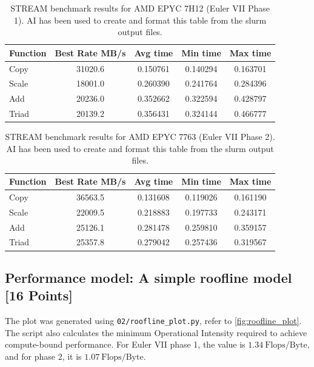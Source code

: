 \documentclass[unicode,10pt,a4paper,oneside,numbers=endperiod,openany]{scrartcl}
\begin{document}
\begin{table}[hbt]
   \centering
   \begin{tabular}{| l | c | c | c | c |}
     \hline
     Function & Best Rate MB/s & Avg time & Min time & Max time \\
     \hline
     Copy & 31020.6 & 0.150761 & 0.140294 & 0.163701 \\
     \hline
     Scale & 18001.0 & 0.260390 & 0.241764 & 0.284396 \\
     \hline
     Add & 20236.0 & 0.352662 & 0.322594 & 0.428797 \\
     \hline
     Triad & 20139.2 & 0.356431 & 0.324144 & 0.466777 \\
     \hline
   \end{tabular}
   \caption{STREAM benchmark results for AMD EPYC 7H12 (Euler VII Phase 1). AI has been used to create and format this table from the slurm output files.}
   \label{tab:stream_7h12}
\end{table}
\begin{table}[hbt]
   \centering
   \begin{tabular}{| l | c | c | c | c |}
     \hline
     Function & Best Rate MB/s & Avg time & Min time & Max time \\
     \hline
     Copy & 36563.5 & 0.131608 & 0.119026 & 0.161190 \\
     \hline
     Scale & 22009.5 & 0.218883 & 0.197733 & 0.243171 \\
     \hline
     Add & 25126.1 & 0.281478 & 0.259810 & 0.359157 \\
     \hline
     Triad & 25357.8 & 0.279042 & 0.257436 & 0.319567 \\
     \hline
   \end{tabular}
   \caption{STREAM benchmark results for AMD EPYC 7763 (Euler VII Phase 2). AI has been used to create and format this table from the slurm output files.}
   \label{tab:stream_7763}
\end{table}


\subsection{Performance model: A simple roofline model [16 Points]}

The plot was generated using \texttt{02/roofline\_plot.py}, refer to \autoref{fig:roofline_plot}. The script also calculates the minimum Operational Intensity required to achieve compute-bound performance. For Euler VII phase 1, the value is $1.34\ \mathrm{Flops}/\mathrm{Byte}$, and for phase 2, it is $1.07\ \mathrm{Flops}/\mathrm{Byte}$.
\end{document}
